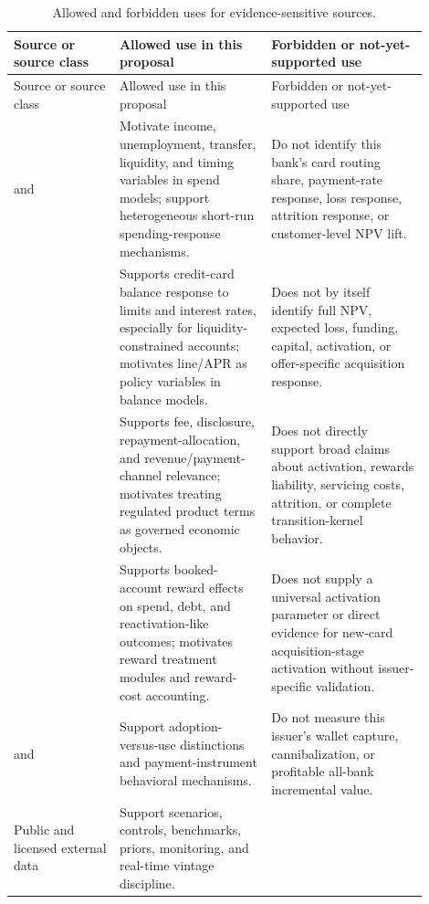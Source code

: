 \documentclass[11pt]{article}
\newcommand{\1}{\mathbf{1}}
\begin{document}
\begin{longtable}{p{0.23\linewidth}p{0.33\linewidth}p{0.34\linewidth}}
\caption{Allowed and forbidden uses for evidence-sensitive sources.}
\label{tab:sensitive-source-boundaries}\\
\toprule
Source or source class & Allowed use in this proposal & Forbidden or not-yet-supported use \\
\midrule
\endfirsthead
\toprule
Source or source class & Allowed use in this proposal & Forbidden or not-yet-supported use \\
\midrule
\endhead
\citet{ganong2019unemployment} and \citet{johnson2004rebates}
  & Motivate income, unemployment, transfer, liquidity, and timing variables in
    spend models; support heterogeneous short-run spending-response mechanisms.
  & Do not identify this bank's card routing share, payment-rate response,
    loss response, attrition response, or customer-level NPV lift. \\
\citet{gross2001liquidity}
  & Supports credit-card balance response to limits and interest rates,
    especially for liquidity-constrained accounts; motivates line/APR as policy
    variables in balance models.
  & Does not by itself identify full NPV, expected loss, funding, capital,
    activation, or offer-specific acquisition response. \\
\citet{agarwal2013cardact}
  & Supports fee, disclosure, repayment-allocation, and revenue/payment-channel
    relevance; motivates treating regulated product terms as governed economic
    objects.
  & Does not directly support broad claims about activation, rewards liability,
    servicing costs, attrition, or complete transition-kernel behavior. \\
\citet{agarwal2010rewards}
  & Supports booked-account reward effects on spend, debt, and reactivation-like
    outcomes; motivates reward treatment modules and reward-cost accounting.
  & Does not supply a universal activation parameter or direct evidence for
    new-card acquisition-stage activation without issuer-specific validation. \\
\citet{koulayev2012payment} and \citet{prelec2001creditcard}
  & Support adoption-versus-use distinctions and payment-instrument behavioral
    mechanisms.
  & Do not measure this issuer's wallet capture, cannibalization, or profitable
    all-bank incremental value. \\
Public and licensed external data
  & Support scenarios, controls, benchmarks, priors, monitoring, and real-time
    vintage discipline.

\end{longtable}
\end{document}

